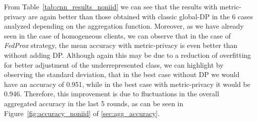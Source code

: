 \documentclass[5p,times]{elsarticle}
\begin{document}
\begin{table}[ht]
    \centering
    \caption{Comparison on non-i.i.d clients of the mean and the standard deviation of the aggregated accuracy in the last five rounds of the FL scheme. Aggregation performed without using DP and with global-DP and metric-privacy with noise multiplier of 0.01. }
    \label{tab:cnn_results_noniid}
\end{table}

From Table~\ref{tab:cnn_results_noniid} we can see that the results with metric-privacy are again better than those obtained with classic global-DP in the 6 cases analyzed depending on the aggregation function. Moreover, as we have already seen in the case of homogeneous clients, we can observe that in the case of \textit{FedProx} strategy, the mean accuracy with metric-privacy is even better than without adding DP. Although again this may be due to a reduction of overfitting for better adjustment of the underrepresented class, we can highlight by observing the standard deviation, that in the best case without DP we would have an accuracy of 0.951, while in the best case with metric-privacy it would be 0.946. Therefore, this improvement is due to fluctuations in the overall aggregated accuracy in the last 5 rounds, as can be seen in Figure~\ref{fig:accuracy_noniid} of \ref{sec:agg_accuracy}. 
\end{document}
